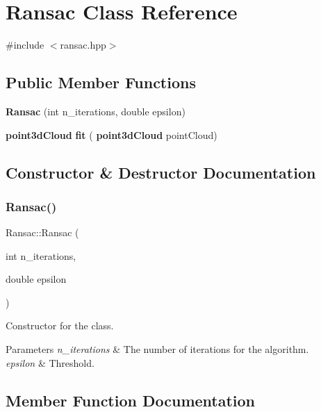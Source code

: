 \section{Ransac Class Reference}
\label{class_ransac}


{\ttfamily \#include $<$ransac.\+hpp$>$}

\subsection*{Public Member Functions}
\begin{DoxyCompactItemize}
\item 
\textbf{ Ransac} (int n\+\_\+iterations, double epsilon)
\item 
\textbf{ point3d\+Cloud} \textbf{ fit} (\textbf{ point3d\+Cloud} point\+Cloud)
\end{DoxyCompactItemize}


\subsection{Constructor \& Destructor Documentation}
\mbox{\label{class_ransac_a7a3ee124a126dec2a26481c49308d817}} 
\subsubsection{Ransac()}
{\footnotesize\ttfamily Ransac\+::\+Ransac (\begin{DoxyParamCaption}\item[{int}]{n\+\_\+iterations,  }\item[{double}]{epsilon }\end{DoxyParamCaption})}

Constructor for the class.


\begin{DoxyParams}{Parameters}
{\em n\+\_\+iterations} & The number of iterations for the algorithm. \\
\hline
{\em epsilon} & Threshold. \\
\hline
\end{DoxyParams}


\subsection{Member Function Documentation}
\mbox{\label{class_ransac_a11ec1f2b097aeb1f2293b080ee538ff2}} 
